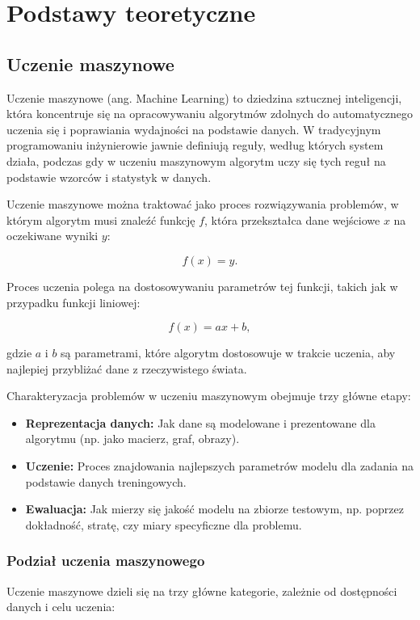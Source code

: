 \chapter{Podstawy teoretyczne}

\section{Uczenie maszynowe}

Uczenie maszynowe (ang. Machine Learning) to dziedzina sztucznej inteligencji, która koncentruje się na opracowywaniu algorytmów zdolnych do automatycznego uczenia się i poprawiania wydajności na podstawie danych. W tradycyjnym programowaniu inżynierowie jawnie definiują reguły, według których system działa, podczas gdy w uczeniu maszynowym algorytm uczy się tych reguł na podstawie wzorców i statystyk w danych.

Uczenie maszynowe można traktować jako proces rozwiązywania problemów, w którym algorytm musi znaleźć funkcję \( f \), która przekształca dane wejściowe \( x \) na oczekiwane wyniki \( y \):

\[
	f(x) = y.
\]

Proces uczenia polega na dostosowywaniu parametrów tej funkcji, takich jak w przypadku funkcji liniowej:

\[
	f(x) = ax + b,
\]

gdzie \( a \) i \( b \) są parametrami, które algorytm dostosowuje w trakcie uczenia, aby najlepiej przybliżać dane z rzeczywistego świata.

Charakteryzacja problemów w uczeniu maszynowym obejmuje trzy główne etapy:
\begin{itemize}
	\item \textbf{Reprezentacja danych:} Jak dane są modelowane i prezentowane dla algorytmu (np. jako macierz, graf, obrazy).
	\item \textbf{Uczenie:} Proces znajdowania najlepszych parametrów modelu dla zadania na podstawie danych treningowych.
	\item \textbf{Ewaluacja:} Jak mierzy się jakość modelu na zbiorze testowym, np. poprzez dokładność, stratę, czy miary specyficzne dla problemu.
\end{itemize}

\subsection{Podział uczenia maszynowego}

Uczenie maszynowe dzieli się na trzy główne kategorie, zależnie od dostępności danych i celu uczenia:

